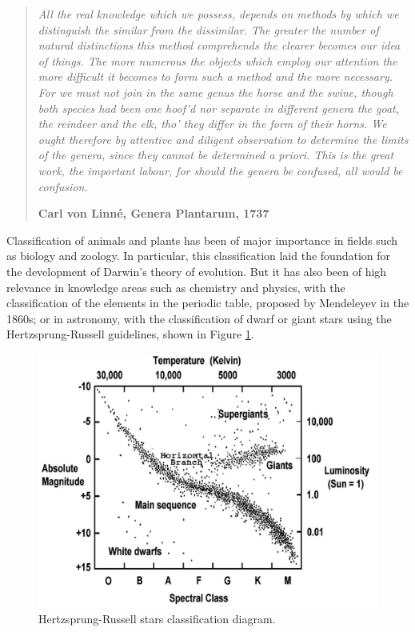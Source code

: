 \begin{quotation}{\slshape
		All the real knowledge which we possess, depends on methods by which we distinguish the similar from the dissimilar. The greater the number of natural distinctions this method comprehends the clearer becomes our idea of things. The
		more numerous the objects which employ our attention the more difficult it becomes to
		form such a method and the more necessary.
		For we must not join in the same genus the horse and the swine, though both species
		had been one hoof’d nor separate in different genera the goat, the reindeer and the elk,
		tho’ they differ in the form of their horns. We ought therefore by attentive and diligent
		observation to determine the limits of the genera, since they cannot be determined a
		priori. This is the great work, the important labour, for should the genera be confused,
		all would be confusion.} 
		\begin{flushright}
			\textbf{Carl von Linné, Genera Plantarum, 1737}
		\end{flushright}
\end{quotation}

Classification of animals and plants has been of major importance in fields such as biology and zoology. In particular, this classification laid the foundation for the development of Darwin's theory of evolution. But it has also been of high relevance in knowledge areas such as chemistry and physics, with the classification of the elements in the periodic table, proposed by Mendeleyev in the 1860s; or in astronomy, with the classification of dwarf or giant stars using the Hertzsprung-Russell guidelines, shown in Figure \ref{fig:intro_HRdiagram}.

\begin{figure}[!h]
	\centering
	\includegraphics[scale=0.35]{gfx/Intro/HR_diagram} 
	\caption[Hertzsprung-Russell stars classification diagram.]{Hertzsprung-Russell stars classification diagram.}\label{fig:intro_HRdiagram}
\end{figure}

